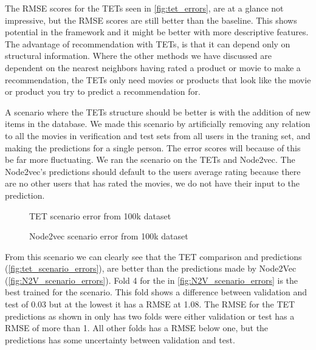 The RMSE scores for the TETs seen in \autoref{fig:tet_errors}, are at a glance not impressive, but the RMSE scores are still better than the baseline. 
This shows potential in the framework and it might be better with more descriptive features. The advantage of recommendation with TETs, is that it can depend only on structural information.
Where the other methods we have discussed are dependent on the nearest neighbors having rated a product or movie to make a recommendation, the TETs only need movies or products that look like the movie or product you try to predict a recommendation for.

A scenario where the TETs structure should be better is with the addition of new items in the database.
We made this scenario by artificially removing any relation to all the movies in verification and test sets from all users in the traning set, and making the predictions for a single person.
The error scores will because of this be far more fluctuating.
We ran the scenario on the TETs and Node2vec.
The Node2vec's predictions should default to the users average rating because there are no other users that has rated the movies, we do not have their input to the prediction.

\begin{figure}[H]
	\centering
	\begin{adjustbox}{width=0.5\textwidth}
		
	\end{adjustbox}
	\caption{TET scenario error from 100k dataset}
	\label{fig:tet_scenario_errors}
\end{figure}

\begin{figure}[H]
	\centering
	\begin{adjustbox}{width=0.5\textwidth}
		
	\end{adjustbox}
	\caption{Node2vec scenario error from 100k dataset}
	\label{fig:N2V_scenario_errors}
\end{figure}

From this scenario we can clearly see that the TET comparison and predictions (\autoref{fig:tet_scenario_errors}), are better than the predictions made by Node2Vec (\autoref{fig:N2V_scenario_errors}).
Fold 4 for the in \autoref{fig:N2V_scenario_errors} is the best trained for the scenario.
This fold shows a difference between validation and test of 0.03 but at the lowest it has a RMSE at 1.08.
The RMSE for the TET predictions  as shown in  only has two folds were either validation or test has a RMSE of more than 1.
All other folds has a RMSE below one, but the predictions has some uncertainty between validation and test.
